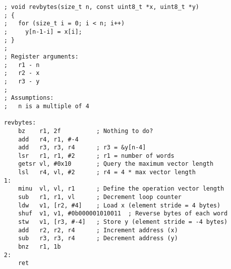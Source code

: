 \begin{lstlisting}[style=assembler]
; void revbytes(size_t n, const uint8_t *x, uint8_t *y)
; {
;   for (size_t i = 0; i < n; i++)
;     y[n-1-i] = x[i];
; }
;
; Register arguments:
;   r1 - n
;   r2 - x
;   r3 - y
;
; Assumptions:
;   n is a multiple of 4

revbytes:
    bz    r1, 2f          ; Nothing to do?
    add   r4, r1, #-4
    add   r3, r3, r4      ; r3 = &y[n-4]
    lsr   r1, r1, #2      ; r1 = number of words
    getsr vl, #0x10       ; Query the maximum vector length
    lsl   r4, vl, #2      ; r4 = 4 * max vector length
1:
    minu  vl, vl, r1      ; Define the operation vector length
    sub   r1, r1, vl      ; Decrement loop counter
    ldw   v1, [r2, #4]    ; Load x (element stride = 4 bytes)
    shuf  v1, v1, #0b000001010011  ; Reverse bytes of each word
    stw   v1, [r3, #-4]   ; Store y (element stride = -4 bytes)
    add   r2, r2, r4      ; Increment address (x)
    sub   r3, r3, r4      ; Decrement address (y)
    bnz   r1, 1b
2:
    ret
\end{lstlisting}

\twocolumn
